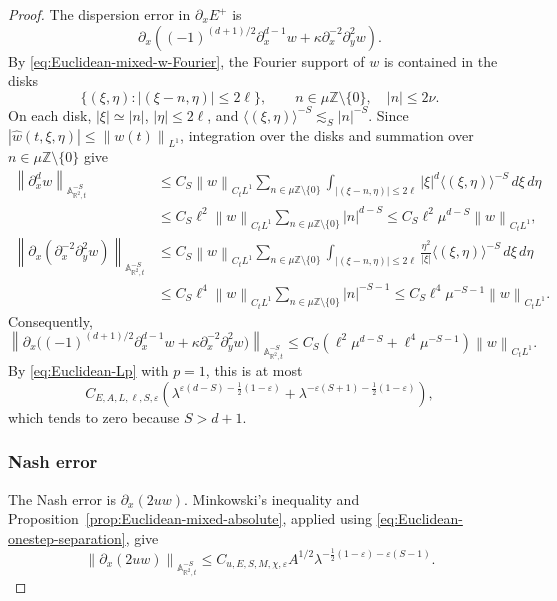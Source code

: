 \documentclass[12pt,reqno,letterpaper]{amsart}
\numberwithin{equation}{section}
\theoremstyle{definition}
\newcommand{\R}{\mathbb R}
\newcommand{\Z}{\mathbb Z}
\newcommand{\A}{\mathbb A}
\newcommand{\eps}{\varepsilon}
\newcommand{\la}{\lambda}
\newcommand{\norm}[1]{\left\lVert #1\right\rVert}
\newcommand{\abs}[1]{\left\lvert #1\right\rvert}
\begin{document}
\begin{proof}
The dispersion error in $\partial_xE^+$ is
\[
 \partial_x\left((-1)^{(d+1)/2}\partial_x^{d-1}w
 +\kappa\partial_x^{-2}\partial_y^2w\right).
\]
By \eqref{eq:Euclidean-mixed-w-Fourier}, the Fourier support of $w$ is
contained in the disks
\[
 \{(\xi,\eta):\abs{(\xi-n,\eta)}\leq2\ell\},
 \qquad n\in\mu\Z\setminus\{0\},\quad \abs n\leq2\nu.
\]
On each disk, $\abs\xi\simeq\abs n$, $\abs\eta\leq2\ell$, and
$\langle(\xi,\eta)\rangle^{-S}\lesssim_S\abs n^{-S}$.
Since $\abs{\widehat w(t,\xi,\eta)}\leq\norm{w(t)}_{L^1}$, integration
over the disks and summation over $n\in\mu\Z\setminus\{0\}$ give
\begin{align*}
 \norm{\partial_x^dw}_{\A^{-S}_{\R^2,t}}
 &\leq C_S\norm w_{C_tL^1}
 \sum_{n\in\mu\Z\setminus\{0\}}
 \int_{\abs{(\xi-n,\eta)}\leq2\ell}
   \abs\xi^d\langle(\xi,\eta)\rangle^{-S}\,d\xi\,d\eta\\
 &\leq C_S\ell^2\norm w_{C_tL^1}
   \sum_{n\in\mu\Z\setminus\{0\}}\abs n^{d-S}
 \leq C_S\ell^2\mu^{d-S}\norm w_{C_tL^1},\\
 \norm{\partial_x(\partial_x^{-2}\partial_y^2w)}
      _{\A^{-S}_{\R^2,t}}
 &\leq C_S\norm w_{C_tL^1}
 \sum_{n\in\mu\Z\setminus\{0\}}
 \int_{\abs{(\xi-n,\eta)}\leq2\ell}
   \frac{\eta^2}{\abs\xi}\langle(\xi,\eta)\rangle^{-S}
   \,d\xi\,d\eta\\
 &\leq C_S\ell^4\norm w_{C_tL^1}
   \sum_{n\in\mu\Z\setminus\{0\}}\abs n^{-S-1}
 \leq C_S\ell^4\mu^{-S-1}\norm w_{C_tL^1}.
\end{align*}
Consequently,
\begin{equation}\label{eq:Euclidean-onestep-dispersion}
 \norm{\partial_x\bigl((-1)^{(d+1)/2}\partial_x^{d-1}w
       +\kappa\partial_x^{-2}\partial_y^2w)}_{\A^{-S}_{\R^2,t}}
 \leq C_S\left(\ell^2\mu^{d-S}
             +\ell^4\mu^{-S-1}\right)\norm w_{C_tL^1}.
\end{equation}
By \eqref{eq:Euclidean-Lp} with $p=1$, this is at most
\[
 C_{E,A,L,\ell,S,\eps}\left(
 \la^{\eps(d-S)-\frac12(1-\eps)}
 +\la^{-\eps(S+1)-\frac12(1-\eps)}\right),
\]
which tends to zero because $S>d+1$.

\subsubsection*{Nash error}

The Nash error is $\partial_x(2uw)$.  Minkowski's inequality and
Proposition~\ref{prop:Euclidean-mixed-absolute}, applied using
\eqref{eq:Euclidean-onestep-separation}, give
\begin{equation}\label{eq:Euclidean-onestep-Nash}
 \norm{\partial_x(2uw)}_{\A^{-S}_{\R^2,t}}
 \leq C_{u,E,S,M,\chi,\eps}A^{1/2}
 \la^{-\frac12(1-\eps)-\eps(S-1)}.
\end{equation}


\end{proof}
\end{document}
